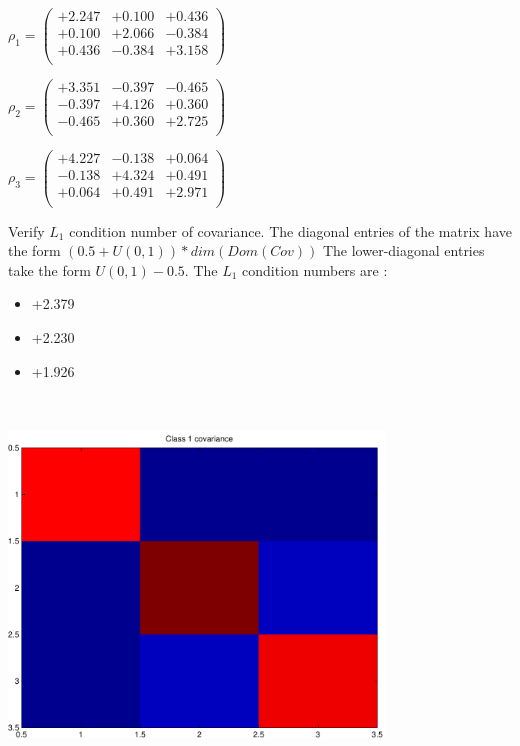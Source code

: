 \documentclass[9pt]{article}
\theoremstyle{plain}
\theoremstyle{definition}
\theoremstyle{remark}
\numberwithin{equation}{section}
\begin{document}
$\rho_1 = \left(
\begin{array}{
ccc}
+2.247 & +0.100 & +0.436 \\
+0.100 & +2.066 & -0.384 \\
+0.436 & -0.384 & +3.158 \\
\end{array}
\right)$ \newline 

$\rho_2 = \left(
\begin{array}{
ccc}
+3.351 & -0.397 & -0.465 \\
-0.397 & +4.126 & +0.360 \\
-0.465 & +0.360 & +2.725 \\
\end{array}
\right)$ \newline 

$\rho_3 = \left(
\begin{array}{
ccc}
+4.227 & -0.138 & +0.064 \\
-0.138 & +4.324 & +0.491 \\
+0.064 & +0.491 & +2.971 \\
\end{array}
\right)$ \newline 

Verify $L_1$ condition number of covariance. The diagonal entries of the matrix have the form $(0.5 + U(0,1) )*dim(Dom(Cov))$
The lower-diagonal entries take the form $U(0,1) - 0.5$. 
The $L_1$ condition numbers are :
\begin{itemize}
\item +2.379
\item +2.230
\item +1.926
\end{itemize}
\includegraphics[width=10.0cm,height=10.0cm]{rv1_corr.pdf}
\end{document}
